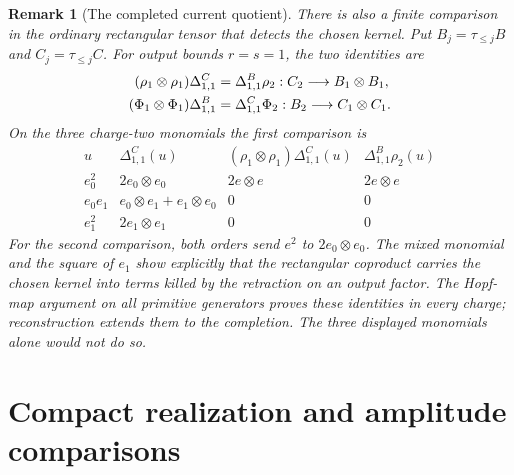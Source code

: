 \documentclass[11pt]{article}
\newtheorem{remark}[theorem]{Remark}
\begin{document}
\begin{remark}[The completed current quotient]
There is also a finite comparison in the ordinary rectangular tensor
that detects the chosen kernel. Put $B_j=\tau_{\leq j}B$ and
$C_j=\tau_{\leq j}C$. For output bounds $r=s=1$, the two identities are
\begin{align}
 (\rho_1\otimes\rho_1)\Delta^C_{1,1}
   &=\Delta^B_{1,1}\rho_2:C_2\longrightarrow B_1\otimes B_1,
   \label{current-rectangle}\\
 (\Phi_1\otimes\Phi_1)\Delta^B_{1,1}
   &=\Delta^C_{1,1}\Phi_2:B_2\longrightarrow C_1\otimes C_1.
   \notag
\end{align}
On the three charge-two monomials the first comparison is
\[
\begin{array}{c|c|c|c}
 u&\Delta^C_{1,1}(u)&
 (\rho_1\otimes\rho_1)\Delta^C_{1,1}(u)&\Delta^B_{1,1}\rho_2(u)\\ \hline
 e_0^2&2e_0\otimes e_0&2e\otimes e&2e\otimes e\\
 e_0e_1&e_0\otimes e_1+e_1\otimes e_0&0&0\\
 e_1^2&2e_1\otimes e_1&0&0
\end{array}
\]
For the second comparison, both orders send $e^2$ to
$2e_0\otimes e_0$. The mixed monomial and the square of $e_1$ show
explicitly that the rectangular coproduct carries the chosen kernel
into terms killed by the retraction on an output factor.
The Hopf-map argument on all primitive generators proves these
identities in every charge; reconstruction extends them to the
completion. The three displayed monomials alone would not do so.
\end{remark}







\section{Compact realization and amplitude comparisons}
\label{sec:compact-realization}
\end{document}
